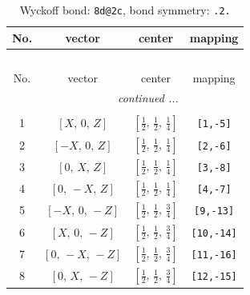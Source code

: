 \documentclass[fleqn,8pt]{jsarticle}
\begin{document}
\renewcommand{\arraystretch}{1.2}
\begin{longtable}{cccc}
\caption{Wyckoff bond: {\tt 8d@2c}, bond symmetry: {\tt .2.}}
 \\
 \hline \hline
No. & vector & center & mapping \\ \hline \endfirsthead

\multicolumn{3}{l}{\tablename\ \thetable{}} \\
 \hline \hline
No. & vector & center & mapping \\ \hline \endhead

 \hline \hline
\multicolumn{3}{r}{\footnotesize\it continued ...} \\ \endfoot

 \hline \hline
\multicolumn{3}{r}{} \\ \endlastfoot

1 & $\left[ X,\, 0,\, Z \right]$ & $\left[ \frac{1}{2},\, \frac{1}{2},\, \frac{1}{4} \right]$ & {\tt [1,-5]} \\ \hline
2 & $\left[ - X,\, 0,\, Z \right]$ & $\left[ \frac{1}{2},\, \frac{1}{2},\, \frac{1}{4} \right]$ & {\tt [2,-6]} \\ \hline
3 & $\left[ 0,\, X,\, Z \right]$ & $\left[ \frac{1}{2},\, \frac{1}{2},\, \frac{1}{4} \right]$ & {\tt [3,-8]} \\ \hline
4 & $\left[ 0,\, - X,\, Z \right]$ & $\left[ \frac{1}{2},\, \frac{1}{2},\, \frac{1}{4} \right]$ & {\tt [4,-7]} \\ \hline
5 & $\left[ - X,\, 0,\, - Z \right]$ & $\left[ \frac{1}{2},\, \frac{1}{2},\, \frac{3}{4} \right]$ & {\tt [9,-13]} \\ \hline
6 & $\left[ X,\, 0,\, - Z \right]$ & $\left[ \frac{1}{2},\, \frac{1}{2},\, \frac{3}{4} \right]$ & {\tt [10,-14]} \\ \hline
7 & $\left[ 0,\, - X,\, - Z \right]$ & $\left[ \frac{1}{2},\, \frac{1}{2},\, \frac{3}{4} \right]$ & {\tt [11,-16]} \\ \hline
8 & $\left[ 0,\, X,\, - Z \right]$ & $\left[ \frac{1}{2},\, \frac{1}{2},\, \frac{3}{4} \right]$ & {\tt [12,-15]} \\
\end{longtable}
\renewcommand{\arraystretch}{1.2}
\end{document}
